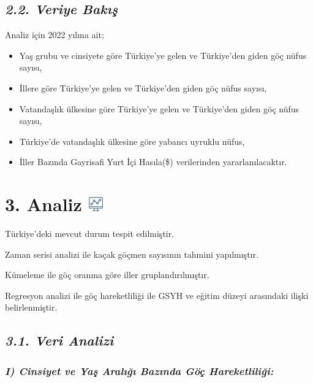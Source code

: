 \documentclass[
  11pt,
  a4paper,
  DIV=11,
  numbers=noendperiod]{scrartcl}
\begin{document}
\subsection{\texorpdfstring{{\emph{2.2. Veriye
Bakış}}}{2.2. Veriye Bakış}}\label{veriye-bakux131ux15f}

Analiz için 2022 yılına ait;

\begin{itemize}
\item
  Yaş grubu ve cinsiyete göre Türkiye'ye gelen ve Türkiye'den giden göç
  nüfus sayısı,
\item
  İllere göre Türkiye'ye gelen ve Türkiye'den giden göç nüfus sayısı,
\item
  Vatandaşlık ülkesine göre Türkiye'ye gelen ve Türkiye'den giden göç
  nüfus sayısı,
\item
  Türkiye'de vatandaşlık ülkesine göre yabancı uyruklu nüfus,
\item
  İller Bazında Gayrisafi Yurt İçi Hasıla(\$) verilerinden
  yararlanılacaktır.
\end{itemize}

\section[{3. Analiz} ]{\texorpdfstring{{3. Analiz}
\protect\includegraphics[width=0.23958in,height=\textheight]{images/clipboard-355426313.png}}{3. Analiz }}\label{analiz}

Türkiye'deki mevcut durum tespit edilmiştir.

Zaman serisi analizi ile kaçak göçmen sayısının tahmini yapılmıştır.

Kümeleme ile göç oranına göre iller gruplandırılmıştır.

Regresyon analizi ile göç hareketliliği ile GSYH ve eğitim düzeyi
arasındaki ilişki belirlenmiştir.

\subsection{\texorpdfstring{\emph{3.1. Veri
Analizi}}{3.1. Veri Analizi}}\label{veri-analizi}

\subsubsection{\texorpdfstring{\emph{I) Cinsiyet ve Yaş Aralığı Bazında
Göç
Hareketliliği:}}{I) Cinsiyet ve Yaş Aralığı Bazında Göç Hareketliliği:}}\label{i-cinsiyet-ve-yaux15f-aralux131ux11fux131-bazux131nda-guxf6uxe7-hareketliliux11fi}
\end{document}
